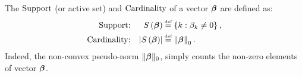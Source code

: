 The $\mathrm{Support}$ (or active set) and $\mathrm{Cardinality}$ of a vector $\boldsymbol{\beta}$ are defined as:
\begin{equation*}
\label{eq:Conventional Support & Cardinality}
\begin{aligned}
\mySuppTxt\textrm{:}&&S\myparanthese{\mybeta} & \myeq \mybrace{k: \beta_{k} \neq 0}, \\
\myCardTxt\textrm{:}&&\myabs{S\myparanthese{\mybeta}} & \myeq \mynorm{\mybeta}_{0}. 
\end{aligned}
\end{equation*}
Indeed, the non-convex pseudo-norm $\Vert \boldsymbol{\beta} \Vert_0$, simply counts the non-zero elements of vector $\boldsymbol{\beta}$.